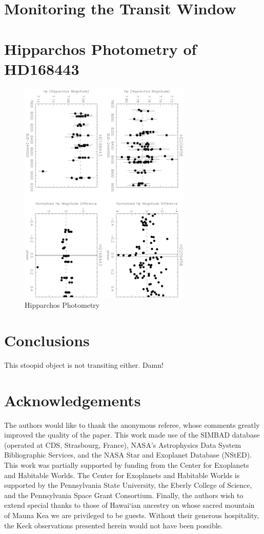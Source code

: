 \documentclass[12pt,preprint]{emulateapj}
\begin{document}
\section{Monitoring the Transit Window}


\section{Hipparchos Photometry of HD168443}

\begin{figure}[h]
  \includegraphics[angle=90,width=8.2cm]{HipparcosCheck}
  \caption{Hipparchos Photometry}
  \label{fig:phot}
\end{figure}

\section{Conclusions}

This stoopid object is not transiting either. Damn!


\section*{Acknowledgements}

The authors would like to thank the anonymous referee, whose comments
greatly improved the quality of the paper. This work made use of the
SIMBAD database (operated at CDS, Strasbourg, France), NASA's
Astrophysics Data System Bibliographic Services, and the NASA Star and
Exoplanet Database (NStED). This work was partially supported by
funding from the Center for Exoplanets and Habitable Worlds. The
Center for Exoplanets and Habitable Worlds is supported by the
Pennsylvania State University, the Eberly College of Science, and the
Pennsylvania Space Grant Consortium. Finally, the authors wish to
extend special thanks to those of Hawai`ian ancestry on whose sacred
mountain of Mauna Kea we are privileged to be guests. Without their
generous hospitality, the Keck observations presented herein would not
have been possible.
\end{document}
